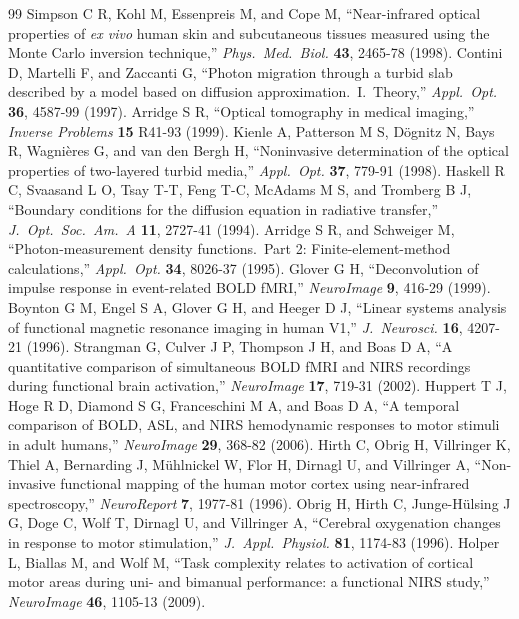 \documentclass[11pt]{article}
\begin{document}
\begin{thebibliography}{99}
 Simpson C R, Kohl M, Essenpreis M, and Cope M, ``Near-infrared optical properties of \textit{ex vivo} human skin and subcutaneous tissues measured using the Monte Carlo inversion technique,'' \textit{Phys.\ Med.\ Biol.} \textbf{43}, 2465-78 (1998).
 Contini D, Martelli F, and Zaccanti G, ``Photon migration through a turbid slab described by a model based on diffusion approximation.\ I.\ Theory,'' \textit{Appl.\ Opt.} \textbf{36}, 4587-99 (1997).
 Arridge S R, ``Optical tomography in medical imaging,'' \textit{Inverse Problems} \textbf{15} R41-93 (1999).
 Kienle A, Patterson M S, D\"ognitz N, Bays R, Wagni\`eres G, and van den Bergh H, ``Noninvasive determination of the optical properties of two-layered turbid media,'' \textit{Appl.\ Opt.} \textbf{37}, 779-91 (1998).
 Haskell R C, Svaasand L O, Tsay T-T, Feng T-C, McAdams M S, and Tromberg B J, ``Boundary conditions for the diffusion equation in radiative transfer,'' \textit{J.\ Opt.\ Soc.\ Am.\ A} \textbf{11}, 2727-41 (1994).
 Arridge S R, and Schweiger M, ``Photon-measurement density functions.\ Part 2: Finite-element-method calculations,'' \textit{Appl.\ Opt.} \textbf{34}, 8026-37 (1995).
 Glover G H, ``Deconvolution of impulse response in event-related BOLD fMRI,'' \textit{NeuroImage} \textbf{9}, 416-29 (1999).
 Boynton G M, Engel S A, Glover G H, and Heeger D J, ``Linear systems analysis of functional magnetic resonance imaging in human V1,'' \textit{J.\ Neurosci.} \textbf{16}, 4207-21 (1996).
 Strangman G, Culver J P, Thompson J H, and Boas D A, ``A quantitative comparison of simultaneous BOLD fMRI and NIRS recordings during functional brain activation,'' \textit{NeuroImage} \textbf{17}, 719-31 (2002).
 Huppert T J, Hoge R D, Diamond S G, Franceschini M A, and Boas D A, ``A temporal comparison of BOLD, ASL, and NIRS hemodynamic responses to motor stimuli in adult humans,'' \textit{NeuroImage} \textbf{29}, 368-82 (2006).
 Hirth C, Obrig H, Villringer K, Thiel A, Bernarding J, Mühlnickel W, Flor H, Dirnagl U, and Villringer A, ``Non-invasive functional mapping of the human motor cortex using near-infrared spectroscopy,'' \textit{NeuroReport} \textbf{7}, 1977-81 (1996).
 Obrig H, Hirth C, Junge-H\"ulsing J G, Doge C, Wolf T, Dirnagl U, and Villringer A, ``Cerebral oxygenation changes in response to motor stimulation,'' \textit{J.\ Appl.\ Physiol.} \textbf{81}, 1174-83 (1996).
 Holper L, Biallas M, and Wolf M, ``Task complexity relates to activation of cortical motor areas during uni- and bimanual performance: a functional NIRS study,'' \textit{NeuroImage} \textbf{46}, 1105-13 (2009).

\end{thebibliography}
\end{document}

